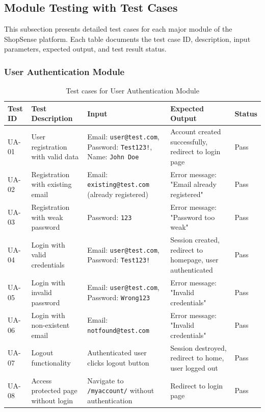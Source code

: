 \subsection{Module Testing with Test Cases}

This subsection presents detailed test cases for each major module of the ShopSense platform. Each table documents the test case ID, description, input parameters, expected output, and test result status.

\subsubsection*{User Authentication Module}

\begin{table}[H]
\centering
\caption{Test cases for User Authentication Module}
\label{tab:test-auth}
\small
\begin{tabular}{|p{1.3cm}|p{3.5cm}|p{3cm}|p{3.5cm}|p{1.2cm}|}
\hline
\textbf{Test ID} & \textbf{Test Description} & \textbf{Input} & \textbf{Expected Output} & \textbf{Status} \\
\hline
UA-01 & User registration with valid data & Email: \texttt{user@test.com}, Password: \texttt{Test123!}, Name: \texttt{John Doe} & Account created successfully, redirect to login page & Pass \\
\hline
UA-02 & Registration with existing email & Email: \texttt{existing@test.com} (already registered) & Error message: "Email already registered" & Pass \\
\hline
UA-03 & Registration with weak password & Password: \texttt{123} & Error message: "Password too weak" & Pass \\
\hline
UA-04 & Login with valid credentials & Email: \texttt{user@test.com}, Password: \texttt{Test123!} & Session created, redirect to homepage, user authenticated & Pass \\
\hline
UA-05 & Login with invalid password & Email: \texttt{user@test.com}, Password: \texttt{Wrong123} & Error message: "Invalid credentials" & Pass \\
\hline
UA-06 & Login with non-existent email & Email: \texttt{notfound@test.com} & Error message: "Invalid credentials" & Pass \\
\hline
UA-07 & Logout functionality & Authenticated user clicks logout button & Session destroyed, redirect to home, user logged out & Pass \\
\hline
UA-08 & Access protected page without login & Navigate to \texttt{/myaccount/} without authentication & Redirect to login page & Pass \\
\hline
\end{tabular}
\end{table}

